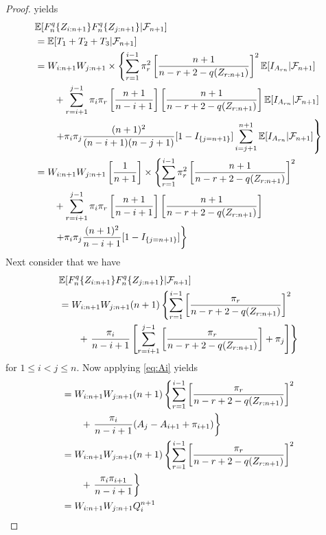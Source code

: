 \begin{proof}
yields
\begin{align*}
&  \mathbb{E}[F_n^q\{Z_{i:n+1}\}F_n^q\{Z_{j:n+1}\}|\mathcal{F}_{n+1}]\\
&= \mathbb{E}[T_1 + T_2 + T_3|\mathcal{F}_{n+1}]\\
&= W_{i:n+1}W_{j:n+1} \times \left\{\sum\limits_{r=1}^{i-1}\pi_r^2\left[\frac{n+1}{n-r+2-q(Z_{r:n+1})} \right]^2 \mathbb{E}[I_{A_{rn}}|\mathcal{F}_{n+1}]\right.\\
& \qquad + \sum\limits_{r=i+1}^{j-1}\pi_i\pi_r \left[\frac{n+1}{n-i+1}\right]\left[\frac{n+1}{n-r+2-q(Z_{r:n+1})}\right]\mathbb{E}[I_{A_{rn}}|\mathcal{F}_{n+1}]\\
& \qquad \left. + \pi_i\pi_j \frac{(n+1)^2}{(n-i+1)(n-j+1)}[1-I_{\{j=n+1\}}]\sum\limits_{i=j+1}^{n+1}\mathbb{E}[I_{A_{rn}}|\mathcal{F}_{n+1}]\right\}\\
&= W_{i:n+1}W_{j:n+1}\left[\frac{1}{n+1}\right] \times \left\{\sum\limits_{r=1}^{i-1}\pi_r^2\left[\frac{n+1}{n-r+2-q(Z_{r:n+1})} \right]^2\right.\\
& \qquad + \sum\limits_{r=i+1}^{j-1}\pi_i\pi_r \left[\frac{n+1}{n-i+1}\right]\left[\frac{n+1}{n-r+2-q(Z_{r:n+1})}\right]\\
& \qquad \left. + \pi_i\pi_j \frac{(n+1)^2}{n-i+1}[1-I_{\{j=n+1\}}]\right\}
\end{align*}
%
Next consider that we have  
\begin{align*}
&  \mathbb{E}[F_n^q\{Z_{i:n+1}\}F_n^q\{Z_{j:n+1}\}|\mathcal{F}_{n+1}]\\
&= W_{i:n+1}W_{j:n+1}(n+1) \left\{\sum\limits_{r=1}^{i-1}\left[\frac{\pi_r}{n-r+2-q(Z_{r:n+1})} \right]^2\right.\\
& \qquad + \left. \frac{\pi_i}{n-i+1} \left[\sum\limits_{r=i+1}^{j-1} \left[\frac{\pi_r}{n-r+2-q(Z_{r:n+1})}\right] + \pi_j \right]\right\}\\
\end{align*}
for $1\leq i<j\leq n$. 
%
Now applying \eqref{eq:Ai} yields
\begin{align*}
&= W_{i:n+1}W_{j:n+1}(n+1) \left\{\sum\limits_{r=1}^{i-1}\left[\frac{\pi_r}{n-r+2-q(Z_{r:n+1})} \right]^2\right.\\
& \qquad + \left. \frac{\pi_i}{n-i+1} (A_j - A_{i+1} + \pi_{i+1})\right\}\\
&= W_{i:n+1}W_{j:n+1}(n+1) \left\{\sum\limits_{r=1}^{i-1}\left[\frac{\pi_r}{n-r+2-q(Z_{r:n+1})} \right]^2\right.\\
& \qquad + \left. \frac{\pi_i\pi_{i+1}}{n-i+1}\right\}\\
&= W_{i:n+1}W_{j:n+1}Q_i^{n+1}
\end{align*}

\end{proof}
